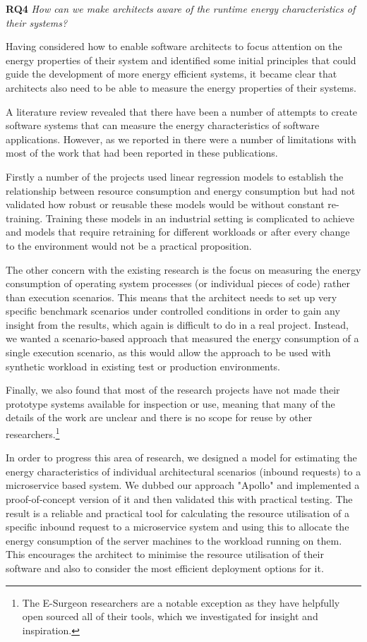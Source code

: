 \textbf{RQ4} \emph{How can we make architects aware of the runtime energy characteristics of their systems?}

Having considered how to enable software architects to focus attention on the energy properties of their system and identified some initial principles that could guide the development of more energy efficient systems, it became clear that architects also need to be able to measure the energy properties of their systems.

A literature review revealed that there have been a number of attempts to create software systems that can measure the energy characteristics of software applications.  However, as we reported in  there were a number of limitations with most of the work that had been reported in these publications.  

Firstly a number of the projects used linear regression models to establish the relationship between resource consumption and energy consumption but had not validated how robust or reusable these models would be without constant re-training.  Training these models in an industrial setting is complicated to achieve and models that require retraining for different workloads or after every change to the environment would not be a practical proposition.  

The other concern with the existing research is the focus on measuring the energy consumption of operating system processes (or individual pieces of code) rather than execution scenarios.  This means that the architect needs to set up very specific benchmark scenarios under controlled conditions in order to gain any insight from the results, which again is difficult to do in a real project.  Instead, we wanted a scenario-based approach that measured the energy consumption of a single execution scenario, as this would allow the approach to be used with synthetic workload in existing test or production environments.  

Finally, we also found that most of the research projects have not made their prototype systems available for inspection or use, meaning that many of the details of the work are unclear and there is no scope for reuse by other researchers.\footnote{The E-Surgeon researchers \cite{noureddine2015-hotspots} are a notable exception as they have helpfully open sourced all of their tools, which we investigated for insight and inspiration.}

In order to progress this area of research, we designed a model for estimating the energy characteristics of individual architectural scenarios (inbound requests) to a microservice based system.  We dubbed our approach "Apollo" and implemented a proof-of-concept version of it and then validated this with practical testing.  The result is a reliable and practical tool for calculating the resource utilisation of a specific inbound request to a microservice system and using this to allocate the energy consumption of the server machines to the workload running on them. This encourages the architect to minimise the resource utilisation of their software and also to consider the most efficient deployment options for it.

